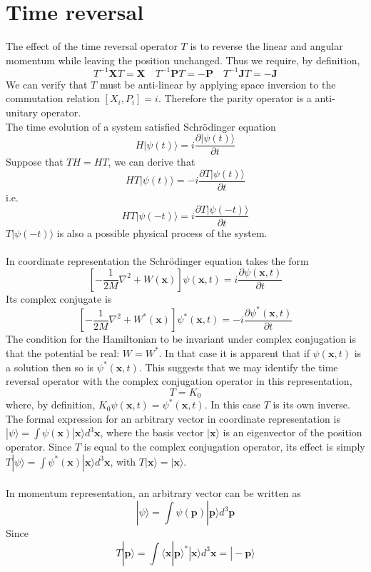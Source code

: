 \section{Time reversal}
The effect of the time reversal operator $T$ is to reverse the linear and angular momentum while leaving the position unchanged. Thus we require, by definition,
\[T^{-1}\bm{X}T = \bm{X} \quad T^{-1}\bm{P}T = -\bm{P} \quad T^{-1}\bm{J}T = -\bm{J}\]
We can verify that $T$ must be anti-linear by applying space inversion to the commutation relation $[X_i,P_i] = i$. Therefore the parity operator is a anti-unitary operator.\\
The time evolution of a system satisfied Schrödinger equation
\[H|\psi(t)\rangle = i\frac{\partial |\psi(t)\rangle }{\partial t}\]
Suppose that $TH=HT$, we can derive that
\[HT|\psi(t)\rangle = -i\frac{\partial T|\psi(t)\rangle }{\partial t}\]
i.e.
\[HT|\psi(-t)\rangle = i\frac{\partial T|\psi(-t)\rangle }{\partial t}\]
$T|\psi(-t)\rangle$ is also a possible physical process of the system.\\ \\
In coordinate representation the Schrödinger equation takes the form
\[ \left[ -\frac{1}{2M}\nabla^2 + W(\bm{x}) \right] \psi(\bm{x},t) = i\frac{\partial \psi(\bm{x},t)}{\partial t}\]
Its complex conjugate is
\[ \left[ -\frac{1}{2M}\nabla^2 + W^*(\bm{x}) \right] \psi^*(\bm{x},t) = -i\frac{\partial \psi^*(\bm{x},t)}{\partial t}\]
The condition for the Hamiltonian to be invariant under complex conjugation is that the potential be real: $W=W^*$. In that case it is apparent that if $\psi(\bm{x},t)$ is a solution then so is  $\psi^*(\bm{x},t)$. This suggests that we may identify the time reversal operator with the complex conjugation operator in this representation,
\[T = K_0\]
where, by definition, $K_0\psi(\bm{x},t) = \psi^*(\bm{x},t)$. In this case $T$ is its own inverse. 
The formal expression for an arbitrary vector in coordinate representation is $|\psi\rangle = \int \psi(\bm{x})|\bm{x}\rangle d^3 \bm{x}$, where the basis vector $|\bm{x}\rangle$ is an eigenvector of the position operator. Since $T$ is equal to the complex conjugation operator, its effect is simply $T|\psi\rangle = \int \psi^*(\bm{x})|\bm{x}\rangle d^3 \bm{x}$, with $T|\bm{x}\rangle = |\bm{x}\rangle$.\\ \\
In momentum representation, an arbitrary vector can be written as
\[|\psi\rangle = \int \psi(\bm{p})|\bm{p}\rangle d^3 \bm{p}\]
Since
\[T|\bm{p}\rangle = \int \langle \bm{x} | \bm{p}\rangle^* |
\bm{x}\rangle d^3 \bm{x} = |-\bm{p}\rangle\]
